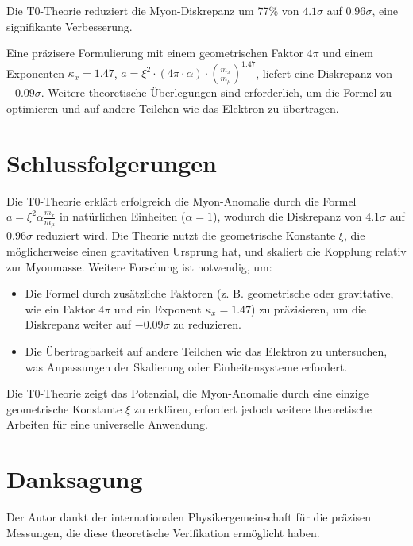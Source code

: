 \documentclass[12pt,a4paper]{article}
\newcommand{\xipar}{\xi}
\begin{document}
	\begin{erfolg}
		Die T0-Theorie reduziert die Myon-Diskrepanz um 77\% von \(4.1\sigma\) auf \(0.96\sigma\), eine signifikante Verbesserung.
	\end{erfolg}
	
	\begin{warnung}
		Eine präzisere Formulierung mit einem geometrischen Faktor \(4\pi\) und einem Exponenten \(\kappa_x = 1.47\), \(a = \xipar^2 \cdot (4\pi \cdot \alpha) \cdot \left(\frac{m_x}{m_\mu}\right)^{1.47}\), liefert eine Diskrepanz von \(-0.09\sigma\). Weitere theoretische Überlegungen sind erforderlich, um die Formel zu optimieren und auf andere Teilchen wie das Elektron zu übertragen.
	\end{warnung}
	
	\section{Schlussfolgerungen}
	
	Die T0-Theorie erklärt erfolgreich die Myon-Anomalie durch die Formel \(a = \xipar^2 \alpha \frac{m_x}{m_\mu}\) in natürlichen Einheiten (\(\alpha = 1\)), wodurch die Diskrepanz von \(4.1\sigma\) auf \(0.96\sigma\) reduziert wird. Die Theorie nutzt die geometrische Konstante \(\xipar\), die möglicherweise einen gravitativen Ursprung hat, und skaliert die Kopplung relativ zur Myonmasse. Weitere Forschung ist notwendig, um:
	\begin{itemize}
		\item Die Formel durch zusätzliche Faktoren (z. B. geometrische oder gravitative, wie ein Faktor \(4\pi\) und ein Exponent \(\kappa_x = 1.47\)) zu präzisieren, um die Diskrepanz weiter auf \(-0.09\sigma\) zu reduzieren.
		\item Die Übertragbarkeit auf andere Teilchen wie das Elektron zu untersuchen, was Anpassungen der Skalierung oder Einheitensysteme erfordert.
	\end{itemize}
	
	Die T0-Theorie zeigt das Potenzial, die Myon-Anomalie durch eine einzige geometrische Konstante \(\xipar\) zu erklären, erfordert jedoch weitere theoretische Arbeiten für eine universelle Anwendung.
	
	\section*{Danksagung}
	
	Der Autor dankt der internationalen Physikergemeinschaft für die präzisen Messungen, die diese theoretische Verifikation ermöglicht haben.
	
\end{document}
